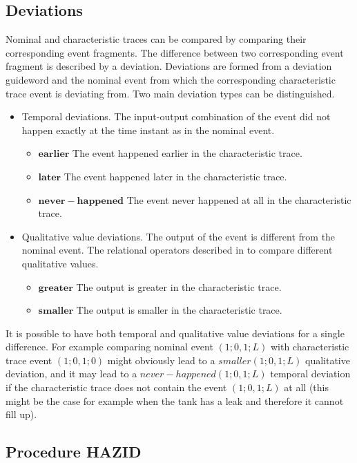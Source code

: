 \documentclass[conference]{IEEEtran}
\begin{document}
\subsection{Deviations}
\label{sec:deviations}
Nominal and characteristic traces can be compared by comparing their corresponding event fragments. The difference between two corresponding event fragment is described by a deviation. Deviations are formed from a deviation guideword and the nominal event from which the corresponding characteristic trace event is deviating from. Two main deviation types can be distinguished.

\begin{itemize}
\item Temporal deviations. The input-output combination of the event did not happen exactly at the time instant as in the nominal event. 
	\begin{itemize}
	  \item $\mathbf{earlier}$ The event happened earlier in the characteristic trace.
	  \item $\mathbf{later}$ The event happened later in the characteristic trace.
	  \item $\mathbf{never-happened}$ The event never happened at all in the characteristic trace.
	\end{itemize}
\item Qualitative value deviations. The output of the event is different from the nominal event. The relational operators described in \cite{KES2010} to compare different qualitative values.
	\begin{itemize}
	  \item $\mathbf{greater}$ The output is greater in the characteristic trace.
	  \item $\mathbf{smaller}$ The output is smaller in the characteristic trace.
	\end{itemize}
\end{itemize}

It is possible to have both temporal and qualitative value deviations for a single difference. For example comparing nominal event $(1;0,1;L)$ with characteristic trace event $(1;0,1;0)$ might obviously lead to a $smaller(1;0,1;L)$ qualitative deviation, and it may lead to a $never-happened(1;0,1;L)$ temporal deviation if the characteristic trace does not contain the event $(1;0,1;L)$ at all (this might be the case for example when the tank has a leak and therefore it cannot fill up).

\subsection{Procedure HAZID}
\label{sec:prochazid}
\end{document}
